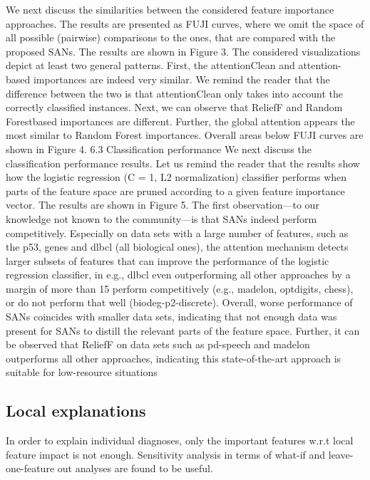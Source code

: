 We next discuss the similarities between the considered feature importance approaches. The results are presented as FUJI curves,
where we omit the space of all possible (pairwise) comparisons to
the ones, that are compared with the proposed SANs. The results are
shown in Figure 3.
The considered visualizations depict at least two general patterns.
First, the attentionClean and attention-based importances are indeed
very similar. We remind the reader that the difference between the
two is that attentionClean only takes into account the correctly classified instances. Next, we can observe that ReliefF and Random Forestbased importances are different. Further, the global attention appears
the most similar to Random Forest importances. Overall areas below
FUJI curves are shown in Figure 4.
6.3 Classification performance
We next discuss the classification performance results. Let us remind
the reader that the results show how the logistic regression (C = 1, L2
normalization) classifier performs when parts of the feature space are
pruned according to a given feature importance vector. The results
are shown in Figure 5.
The first observation—to our knowledge not known to the
community—is that SANs indeed perform competitively. Especially
on data sets with a large number of features, such as the p53, genes
and dlbcl (all biological ones), the attention mechanism detects larger
subsets of features that can improve the performance of the logistic
regression classifier, in e.g., dlbcl even outperforming all other approaches by a margin of more than 15%
perform competitively (e.g., madelon, optdigits, chess), or do not perform that well (biodeg-p2-discrete). Overall, worse performance of
SANs coincides with smaller data sets, indicating that not enough
data was present for SANs to distill the relevant parts of the feature
space. Further, it can be observed that ReliefF on data sets such as
pd-speech and madelon outperforms all other approaches, indicating
this state-of-the-art approach is suitable for low-resource situations

\subsection{Local explanations}
In order to explain individual diagnoses, only the important features w.r.t local feature impact is not enough. Sensitivity analysis in terms of what-if and leave-one-feature out analyses are found to be useful. 

